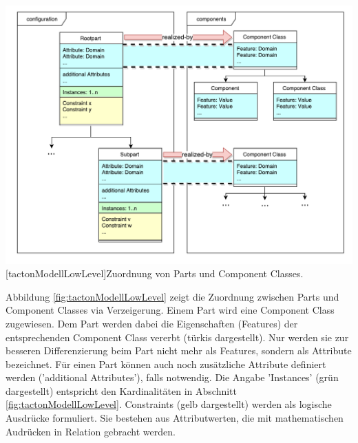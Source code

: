 \documentclass[12pt,a4paper,bibliography=totocnumbered,listof=totoc]{scrartcl}
\begin{document}
\vspace{1em}
\begin{minipage}{\linewidth}
	\centering
	\includegraphics[width=1\linewidth]{Abbildungen/tactonModellLowLevel.pdf}
	[tactonModellLowLevel]{Zuordnung von Parts und Component Classes.}
	\label{fig:tactonModellLowLevel}
\end{minipage}
\vspace{1em}

Abbildung \ref{fig:tactonModellLowLevel} zeigt die Zuordnung zwischen Parts und Component Classes via Verzeigerung. Einem Part wird eine Component Class zugewiesen. Dem Part werden dabei die Eigenschaften (Features) der entsprechenden Component Class vererbt (türkis dargestellt). Nur werden sie zur besseren Differenzierung beim Part nicht mehr als Features, sondern als Attribute bezeichnet. Für einen Part können auch noch zusätzliche Attribute definiert werden ('additional Attributes'), falls notwendig. Die Angabe 'Instances' (grün dargestellt) entspricht den Kardinalitäten in Abschnitt \ref{fig:tactonModellLowLevel}. Constraints (gelb dargestellt) werden als logische Ausdrücke formuliert. Sie bestehen aus Attributwerten, die mit mathematischen Audrücken in Relation gebracht werden.
\end{document}
